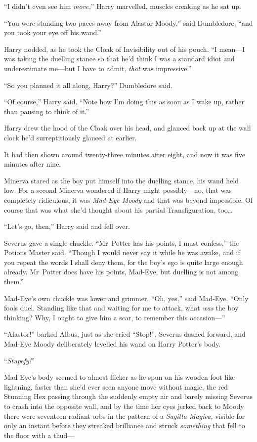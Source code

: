 “I didn’t even see him \emph{move,}” Harry marvelled, muscles creaking as he sat up.

“You were standing two paces away from Alastor Moody,” said Dumbledore, “and you took your eye off his wand.”

Harry nodded, as he took the Cloak of Invisibility out of his pouch. “I mean—I was taking the duelling stance so that he’d think I was a standard idiot and underestimate me—but I have to admit, \emph{that} was impressive.”

“So you planned it all along, Harry?” Dumbledore said.

“Of course,” Harry said. “Note how I’m doing this as soon as I wake up, rather than pausing to think of it.”

Harry drew the hood of the Cloak over his head, and glanced back up at the wall clock he’d surreptitiously glanced at earlier.

It had then shown around twenty-three minutes after eight, and now it was five minutes after nine.

\later

Minerva stared as the boy put himself into the duelling stance, his wand held low. For a second Minerva wondered if Harry might possibly—no, that was completely ridiculous, it was \emph{Mad-Eye Moody} and that was beyond impossible. Of course that was what she’d thought about his partial Transfiguration, too…

“Let’s go, then,” Harry said and fell over.

Severus gave a single chuckle. “Mr~Potter has his points, I must confess,” the Potions Master said. “Though I would never say it while he was awake, and if you repeat the words I shall deny them, for the boy’s ego is quite large enough already. Mr~Potter does have his points, Mad-Eye, but duelling is not among them.”

Mad-Eye’s own chuckle was lower and grimmer. “Oh, yes,” said Mad-Eye. “Only fools duel. Standing like that and waiting for me to attack, what \emph{was} the boy thinking? Why, I ought to give him a scar, to remember this occasion—”

“Alastor!” barked Albus, just as she cried “Stop!”, Severus dashed forward, and Mad-Eye Moody deliberately levelled his wand on Harry Potter’s body.

“\emph{Stupefy!}”

Mad-Eye’s body seemed to almost flicker as he spun on his wooden foot like lightning, faster than she’d ever seen anyone move without magic, the red Stunning Hex passing through the suddenly empty air and barely missing Severus to crash into the opposite wall, and by the time her eyes jerked back to Moody there were seventeen radiant orbs in the pattern of a \emph{Sagitta Magica,} visible for only an instant before they streaked brilliance and struck \emph{something} that fell to the floor with a thud—

